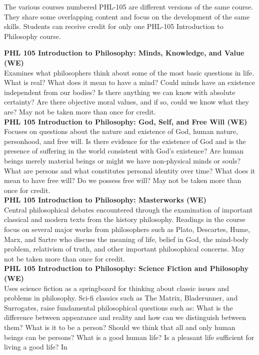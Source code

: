 \documentclass[
  letterpaper,
]{scrbook}
\begin{document}
The various courses numbered PHL-105 are different versions of the same
course. They share some overlapping content and focus on the development
of the same skills. Students can receive credit for only one PHL-105
Introduction to Philosophy course.

\textbf{PHL 105 Introduction to Philosophy: Minds, Knowledge, and Value
(WE)}\\
Examines what philosophers think about some of the most basic questions
in life. What is real? What does it mean to have a mind? Could minds
have an existence independent from our bodies? Is there anything we can
know with absolute certainty? Are there objective moral values, and if
so, could we know what they are? May not be taken more than once for
credit.\\
\textbf{PHL 105 Introduction to Philosophy: God, Self, and Free Will
(WE)}\\
Focuses on questions about the nature and existence of God, human
nature, personhood, and free will. Is there evidence for the existence
of God and is the presence of suffering in the world consistent with
God's existence? Are human beings merely material beings or might we
have non-physical minds or souls? What are persons and what constitutes
personal identity over time? What does it mean to have free will? Do we
possess free will? May not be taken more than once for credit.\\
\textbf{PHL 105 Introduction to Philosophy: Masterworks (WE)}\\
Central philosophical debates encountered through the examination of
important classical and modern texts from the history philosophy.
Readings in the course focus on several major works from philosophers
such as Plato, Descartes, Hume, Marx, and Sartre who discuss the meaning
of life, belief in God, the mind-body problem, relativism of truth, and
other important philosophical concerns. May not be taken more than once
for credit.\\
\textbf{PHL 105 Introduction to Philosophy: Science Fiction and
Philosophy (WE)}\\
Uses science fiction as a springboard for thinking about classic issues
and problems in philosophy. Sci-fi classics such as The Matrix,
Bladerunner, and Surrogates, raise fundamental philosophical questions
such as: What is the difference between appearance and reality and how
can we distinguish between them? What is it to be a person? Should we
think that all and only human beings can be persons? What is a good
human life? Is a pleasant life sufficient for living a good life? In
\end{document}
